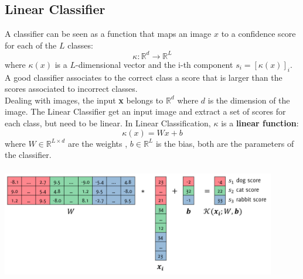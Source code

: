 \subsection{Linear Classifier}
A classifier can be seen as a function that maps an image $x$ to a confidence score for each of the $L$ classes: $$\kappa: \mathbb{R}^d \rightarrow \mathbb{R}^L $$
where $\kappa(x)$ is a $L$-dimensional vector and the i-th component $s_i = [\kappa(x)]_i$. A good classifier associates to the correct class a score that is larger than the scores associated to incorrect classes. \\
Dealing with images, the input \textbf{x} belongs to $\mathbb{R}^d$ where $d$ is the dimension of the image. The Linear Classifier get an input image and extract a set of scores for each class, but need to be linear. In Linear Classification, $\kappa$ is a \textbf{linear function}: 
$$ \kappa(x) = Wx + b $$
where $W \in \mathbb{R}^{L \times d}$ are the weights , $b \in \mathbb{R}^L$ is the bias, both are the parameters of the classifier. \\ 

\begin{minipage}{\linewidth}
        \centering
        \includegraphics[width=12cm, height=5cm]{images/linear_class.png}
\end{minipage}

